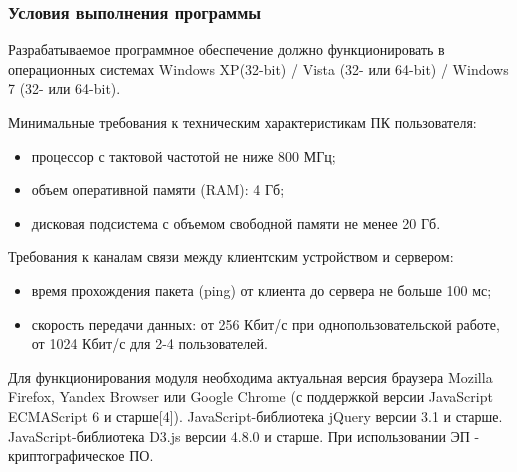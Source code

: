 \documentclass[a4paper]{extarticle}
\numberwithin{equation}{section}
\begin{document}
\subsubsection{Условия выполнения программы}
Разрабатываемое программное обеспечение должно функционировать в операционных системах Windows XP(32-bit) / Vista (32- или 64-bit) / Windows 7 (32- или 64-bit).\par
Минимальные требования к техническим характеристикам ПК пользователя:\par
\begin{itemize}
  \item процессор с тактовой частотой не ниже 800 МГц;
  \item объем оперативной памяти (RAM): 4 Гб;
  \item дисковая подсистема с объемом свободной памяти не менее 20 Гб.
\end{itemize}\par
Требования к каналам связи между клиентским устройством и сервером:\par
\begin{itemize}
  \item время прохождения пакета (ping) от клиента до сервера не больше 100 мс;
  \item скорость передачи данных: от 256 Кбит/с при однопользовательской работе, от 1024 Кбит/с для 2-4 пользователей.
\end{itemize}\par
Для функционирования модуля необходима актуальная версия браузера Mozilla Firefox, Yandex Browser или Google Chrome (с поддержкой версии JavaScript ECMAScript 6 и старше[4]). JavaScript-библиотека jQuery версии 3.1 и старше. JavaScript-библиотека D3.js версии 4.8.0 и старше. При использовании ЭП - криптографическое ПО.
\end{document}
